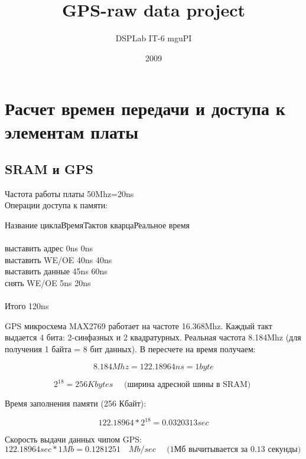 \documentclass{report}
\title{GPS-raw data project}
\author{DSPLab IT-6 mguPI}
\date{2009}
\begin{document}
\maketitle

\chapter{Расчет времен передачи и доступа к элементам платы}
\section{SRAM и GPS}

Частота работы платы 50Mhz=20ns\\

Операции доступа к памяти:
\begin{tabbing}
Название цикла\qquad\=Время\qquad\=Тактов кварца\qquad\=Реальное время\\
\\
выставить адрес \> 0ns  \> 0ns \\
выставить WE/OE \> 40ns  \> 40ns \\
выставить данные \> 45ns  \> 60ns \\
снять WE/OE \> 5ns  \> 20ns \\
\\
Итого \>  \> 120ns \\
\end{tabbing}

GPS микросхема MAX2769 работает на частоте 16.368Mhz. Каждый такт выдается 4 бита: 2-синфазных и 2 квадратурных. Реальная частота
8.184Mhz (для получения 1 байта = 8 бит данных). В пересчете на время получаем:

\begin{equation}
8.184Mhz = 122.18964ns = 1byte 
\end{equation}

\begin{equation}
2^{18} = 256Kbytes\quad\mbox{ (ширина адресной шины в SRAM) }
\end{equation}

Время заполнения памяти (256 Кбайт):

\begin{equation}
122.18964 * 2^{18} = 0.0320313sec 
\end{equation}

Скорость выдачи данных чипом GPS:
\begin{equation}
122.18964sec * 1Mb = 0.1281251\quad Mb/sec\quad\mbox{ (1Мб вычитывается за 0.13 секунды) }
\end{equation}
\end{document}
